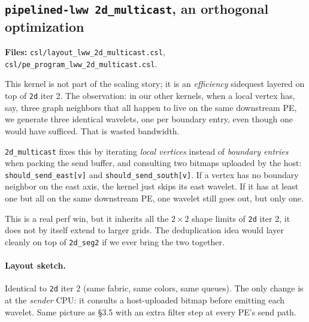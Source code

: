 \documentclass[11pt]{article}
\newcommand{\code}[1]{\texttt{#1}}
\newcommand{\file}[1]{\texttt{#1}}
\begin{document}
\subsection{\code{pipelined-lww 2d\_multicast}, an orthogonal optimization}
\textbf{Files:} \file{csl/layout\_lww\_2d\_multicast.csl},
\file{csl/pe\_program\_lww\_2d\_multicast.csl}.

This kernel is not part of the scaling story; it is an
\emph{efficiency} sidequest layered on top of \code{2d} iter 2.
The observation: in our other kernels, when a local vertex has,
say, three graph neighbors that all happen to live on the same
downstream PE, we generate three identical wavelets, one per
boundary entry, even though one would have sufficed. That is
wasted bandwidth.

\code{2d\_multicast} fixes this by iterating \emph{local
vertices} instead of \emph{boundary entries} when packing the
send buffer, and consulting two bitmaps uploaded by the host:
\code{should\_send\_east[v]} and \code{should\_send\_south[v]}.
If a vertex has no boundary neighbor on the east axis, the
kernel just skips its east wavelet. If it has at least one but
all on the same downstream PE, one wavelet still goes out, but
only one.

This is a real perf win, but it inherits all the $2 \times 2$
shape limits of \code{2d} iter 2, it does not by itself
extend to larger grids. The deduplication idea would layer
cleanly on top of \code{2d\_seg2} if we ever bring the two
together.

\paragraph{Layout sketch.} Identical to \code{2d} iter 2 (same
fabric, same colors, same queues). The only change is at the
\emph{sender} CPU: it consults a host-uploaded bitmap before
emitting each wavelet. Same picture as \S3.5 with an extra
filter step at every PE's send path.

\begin{center}
\end{center}
\end{document}
